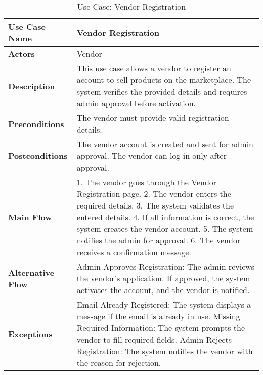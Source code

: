 \begin{table}[h]
\centering
\begin{tabular}{|p{3cm}|p{10cm}|}
\hline
\textbf{Use Case Name} & Vendor Registration \\
\hline
\textbf{Actors} & Vendor \\
\hline
\textbf{Description} & This use case allows a vendor to register an account to sell products on the marketplace. The system verifies the provided details and requires admin approval before activation. \\
\hline
\textbf{Preconditions} & The vendor must provide valid registration details. \\
\hline
\textbf{Postconditions} & The vendor account is created and sent for admin approval. The vendor can log in only after approval. \\
\hline
\textbf{Main Flow} & 1. The vendor goes through the Vendor Registration page. 2. The vendor enters the required details. 3. The system validates the entered details. 4. If all information is correct, the system creates the vendor account. 5. The system notifies the admin for approval. 6. The vendor receives a confirmation message. \\
\hline
\textbf{Alternative Flow} & Admin Approves Registration: The admin reviews the vendor's application. If approved, the system activates the account, and the vendor is notified. \\
\hline
\textbf{Exceptions} & Email Already Registered: The system displays a message if the email is already in use. Missing Required Information: The system prompts the vendor to fill required fields. Admin Rejects Registration: The system notifies the vendor with the reason for rejection. \\
\hline
\end{tabular}
\caption{Use Case: Vendor Registration}
\end{table}

